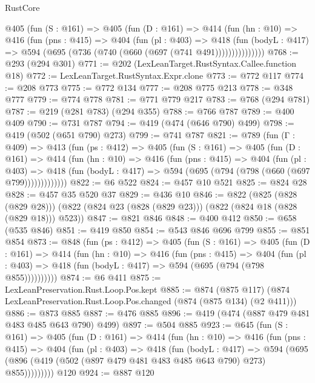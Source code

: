 \begin{lexlean}{RustCore}
\begin{coremodule}
        @405
          (fun (S : @161) =>
          @405
            (fun (D : @161) =>
            @414
              (fun (hn : @10) =>
              @416
                (fun (pns : @415) =>
                @404
                  (fun (pl : @403) =>
                  @418
                    (fun (bodyL : @417) =>
                    @594 (@695 (@736 (@740 (@660 (@697 (@741 @491)))))))))))))))
@768 := @293 (@294 @301)
@771 := @202 (LexLeanTarget.RustSyntax.Callee.function @18)
@772 := LexLeanTarget.RustSyntax.Expr.clone
@773 := @772 @117
@774 := @208 @773
@775 := @772 @134
@777 := @208 @775 @213
@778 := @348 @777
@779 := @774 @778
@781 := @771 @779 @217
@783 := @768 (@294 @781)
@787 := @219 (@281 @783) (@294 @355)
@788 := @766 @787
@789 := @400 @409
@790 := @731 @787
@794 := @419 (@474 (@646 @790) @499)
@798 := @419 (@502 (@651 @790) @273)
@799 := @741 @787
@821 := @789
    (fun (Γ : @409) =>
    @413
      (fun (ps : @412) =>
      @405
        (fun (S : @161) =>
        @405
          (fun (D : @161) =>
          @414
            (fun (hn : @10) =>
            @416
              (fun (pns : @415) =>
              @404
                (fun (pl : @403) =>
                @418 (fun (bodyL : @417) => @594 (@695 (@794 (@798 (@660 (@697 @799)))))))))))))
@822 := @6 @522
@824 := @457 @10 @521
@825 := @824 @28
@828 := @457 @35 @520 @37
@829 := @436 @10
@846 := @822
    (@825 (@828 (@829 @28)))
    (@822 (@824 @23 (@828 (@829 @23))) (@822 (@824 @18 (@828 (@829 @18))) @523))
@847 := @821 @846
@848 := @400 @412
@850 := @658 (@535 @846)
@851 := @419 @850
@854 := @543 @846 @696 @799
@855 := @851 @854
@873 := @848
    (fun (ps : @412) =>
    @405
      (fun (S : @161) =>
      @405
        (fun (D : @161) =>
        @414
          (fun (hn : @10) =>
          @416
            (fun (pns : @415) =>
            @404
              (fun (pl : @403) => @418 (fun (bodyL : @417) => @594 (@695 (@794 (@798 @855))))))))))
@874 := @6 @411
@875 := LexLeanPreservation.Rust.Loop.Pos.kept
@885 := @874
    (@875 @117)
    (@874 LexLeanPreservation.Rust.Loop.Pos.changed (@874 (@875 @134) (@2 @411)))
@886 := @873 @885
@887 := @476 @885
@896 := @419 (@474 (@887 @479 @481 @483 @485 @643 @790) @499)
@897 := @504 @885
@923 := @645
    (fun (S : @161) =>
    @405
      (fun (D : @161) =>
      @414
        (fun (hn : @10) =>
        @416
          (fun (pns : @415) =>
          @404
            (fun (pl : @403) =>
            @418
              (fun (bodyL : @417) =>
              @594 (@695 (@896 (@419 (@502 (@897 @479 @481 @483 @485 @643 @790) @273) @855)))))))))
    @120
@924 := @887 @120

\end{coremodule}
\end{lexlean}
